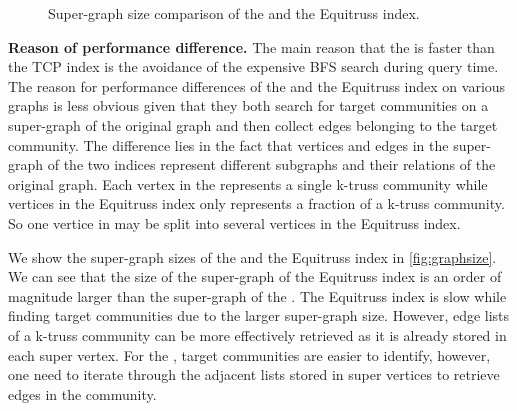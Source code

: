 \begin{figure}[h]
\centering
{}
\caption{Super-graph size comparison of the \twolevelindex{} and the Equitruss index.}
\label{fig:graphsize}
\end{figure}

\vskip 0.1in \noindent \textbf{Reason of performance difference.} The main reason that the \twolevelindex{} is faster than the TCP index is the avoidance of the expensive BFS search during query time. The reason for performance differences of the \twolevelindex{} and the Equitruss index on various graphs is less obvious given that they both search for target communities on a super-graph of the original graph and then collect edges belonging to the target community. The difference lies in the fact that vertices and edges in the super-graph of the two indices represent different subgraphs and their relations of the original graph. Each vertex in the \twolevelindex{} represents a single k-truss community while vertices in the Equitruss index only represents a fraction of a k-truss community. So one vertice in \twolevelindex{} may be split into several vertices in the Equitruss index. 

We show the super-graph sizes of the \twolevelindex{} and the Equitruss index in \autoref{fig:graphsize}. We can see that the size of the super-graph of the Equitruss index is an order of magnitude larger than the super-graph of the \twolevelindex{}. The Equitruss index is slow while finding target communities due to the larger super-graph size. However, edge lists of a k-truss community can be more effectively retrieved as it is already stored in each super vertex. For the \twolevelindex{}, target communities are easier to identify, however, one need to iterate through the adjacent lists stored in super vertices to retrieve edges in the community. %

